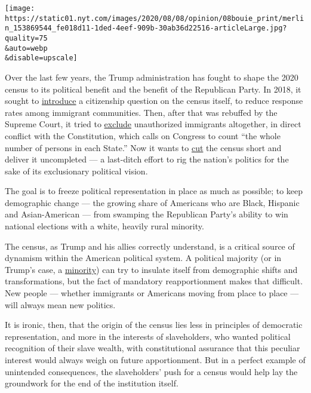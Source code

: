 \texttt{[image: https://static01.nyt.com/images/2020/08/08/opinion/08bouie\_print/merlin\_153869544\_fe018d11-1ded-4eef-909b-30ab36d22516-articleLarge.jpg?quality=75\\\&auto=webp\\\&disable=upscale]}

Over the last few years, the Trump administration has fought to shape
the 2020 census to its political benefit and the benefit of the
Republican Party. In 2018, it sought to
\href{https://www.scotusblog.com/2019/07/trump-administration-ends-effort-to-include-citizenship-question-on-2020-census/}{introduce}
a citizenship question on the census itself, to reduce response rates
among immigrant communities. Then, after that was rebuffed by the
Supreme Court, it tried to
\href{https://www.vox.com/policy-and-politics/2020/7/21/21328714/trump-executive-order-immigration-census-2020-redistricting}{exclude}
unauthorized immigrants altogether, in direct conflict with the
Constitution, which calls on Congress to count ``the whole number of
persons in each State.'' Now it wants to
\href{https://www.npr.org/2020/08/03/898548910/census-cut-short-a-month-rushes-to-finish-all-counting-efforts-by-sept-30}{cut}
the census short and deliver it uncompleted --- a last-ditch effort to
rig the nation's politics for the sake of its exclusionary political
vision.

The goal is to freeze political representation in place as much as
possible; to keep demographic change --- the growing share of Americans
who are Black, Hispanic and Asian-American --- from swamping the
Republican Party's ability to win national elections with a white,
heavily rural minority.

The census, as Trump and his allies correctly understand, is a critical
source of dynamism within the American political system. A political
majority (or in Trump's case, a
\href{https://www.nytimes.com/2020/08/04/opinion/trump-2020-electoral-college.html}{minority})
can try to insulate itself from demographic shifts and transformations,
but the fact of mandatory reapportionment makes that difficult. New
people --- whether immigrants or Americans moving from place to place
--- will always mean new politics.

It is ironic, then, that the origin of the census lies less in
principles of democratic representation, and more in the interests of
slaveholders, who wanted political recognition of their slave wealth,
with constitutional assurance that this peculiar interest would always
weigh on future apportionment. But in a perfect example of unintended
consequences, the slaveholders' push for a census would help lay the
groundwork for the end of the institution itself.

